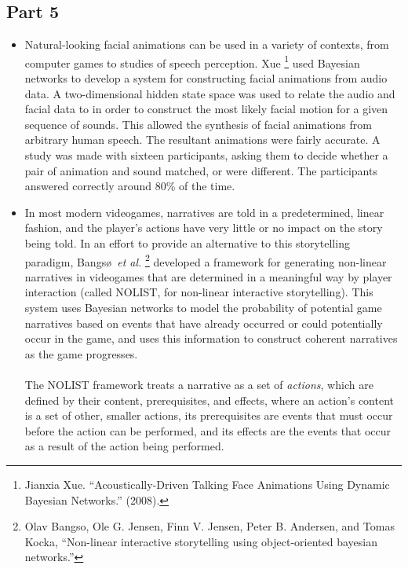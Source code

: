 \documentclass[11pt]{article}
\begin{document}
\subsection*{Part 5}
\begin{itemize}
\item Natural-looking facial animations can be used in a variety of contexts, from computer games to studies of speech perception. Xue \footnote{Jianxia Xue. ``Acoustically-Driven Talking Face Animations Using Dynamic Bayesian Networks.'' (2008).} used Bayesian networks to develop a system for constructing facial animations from audio data. A two-dimensional hidden state space was used to relate the audio and facial data to in order to construct the most likely facial motion for a given sequence of sounds. This allowed the synthesis of facial animations from arbitrary human speech. The resultant animations were fairly accurate. A study was made with sixteen participants, asking them to decide whether a pair of animation and sound matched, or were different. The participants answered correctly around 80\% of the time.
\item In most modern videogames, narratives are told in a predetermined, linear fashion, and the player's actions have very little or no impact on the story being told. In an effort to provide an alternative to this storytelling paradigm, Bangs\o \ \emph{et al.} \footnote{Olav Bangso, Ole G. Jensen, Finn V. Jensen, Peter B. Andersen, and Tomas Kocka, “Non-linear interactive storytelling using object-oriented bayesian networks.”} developed a framework for generating non-linear narratives in videogames that are determined in a meaningful way by player interaction (called NOLIST, for non-linear interactive storytelling). This system uses Bayesian networks to model the probability of potential game narratives based on events that have already occurred or could potentially occur in the game, and uses this information to construct coherent narratives as the game progresses. \\
\\The NOLIST framework treats a narrative as a set of \emph{actions}, which are defined by their content, prerequisites, and effects, where an action's content is a set of other, smaller actions, its prerequisites are events that must occur before the action can be performed, and its effects are the events that occur as a result of the action being performed. \\

\end{itemize}
\end{document}
